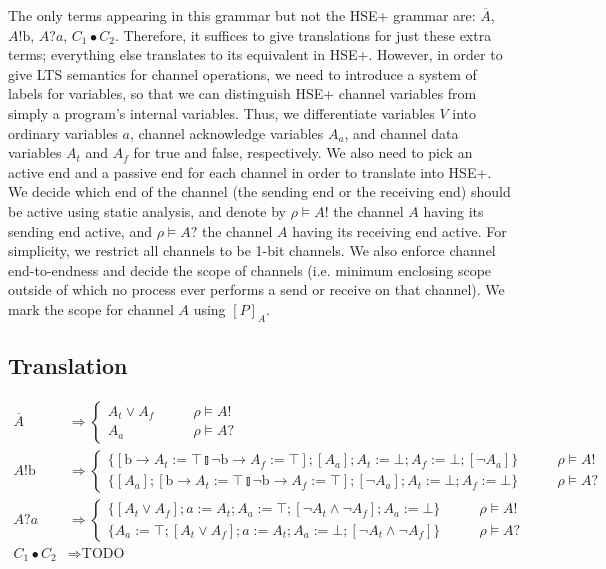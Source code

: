 \documentclass{article}
\begin{document}
The only terms appearing in this grammar but not the HSE+ grammar are: $\overline{A}$, $A!\mathrm{b}$, $A?a$, $C_1 \bullet C_2$.
Therefore, it suffices to give translations for just these extra terms; everything else translates to its equivalent in HSE+.
However, in order to give LTS semantics for channel operations, we need to introduce a system of labels for variables, so that we can distinguish HSE+ channel variables from simply a program's internal variables.
Thus, we differentiate variables $V$ into ordinary variables $a$, channel acknowledge variables $A_a$, and channel data variables $A_t$ and $A_f$ for true and false, respectively.
We also need to pick an active end and a passive end for each channel in order to translate into HSE+.
We decide which end of the channel (the sending end or the receiving end) should be active using static analysis, and denote by $\rho \vDash A!$ the channel $A$ having its sending end active, and $\rho \vDash A?$ the channel $A$ having its receiving end active.
For simplicity, we restrict all channels to be 1-bit channels.
We also enforce channel end-to-endness and decide the scope of channels (i.e. minimum enclosing scope outside of which no process ever performs a send or receive on that channel).
We mark the scope for channel $A$ using $[P]_A$.

\subsection{Translation}
\begin{align*}
    \overline{A} & \Rightarrow \left\{ \begin{matrix} A_t \vee A_f & \qquad \rho \vDash A! \\ A_a & \qquad \rho \vDash A? \end{matrix} \right. \\
    A!\mathrm{b} & \Rightarrow \left\{ \begin{matrix} \{[\mathrm{b} \rightarrow A_t := \top \talloblong \neg \mathrm{b} \rightarrow A_f := \top]; [A_a]; A_t := \bot; A_f := \bot; [\neg A_a]\} & \qquad \rho \vDash A! \\
                                                      \{[A_a]; [\mathrm{b} \rightarrow A_t := \top \talloblong \neg \mathrm{b} \rightarrow A_f := \top]; [\neg A_a]; A_t := \bot; A_f := \bot\} & \qquad \rho \vDash A? \end{matrix} \right. \\
    A?a & \Rightarrow \left\{ \begin{matrix} \{[A_t \vee A_f]; a := A_t; A_a := \top; [\neg A_t \wedge \neg A_f]; A_a := \bot\} & \qquad \rho \vDash A! \\
                                             \{A_a := \top; [A_t \vee A_f]; a := A_t; A_a := \bot; [\neg A_t \wedge \neg A_f]\} & \qquad \rho \vDash A? \end{matrix} \right. \\
    C_1 \bullet C_2 & \Rightarrow \text{TODO}
\end{align*}
\end{document}
